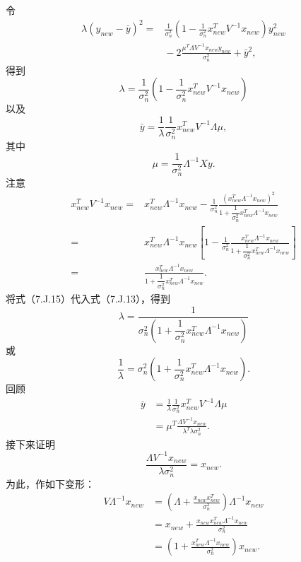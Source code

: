 令
\[
\begin{aligned}
\lambda(y_{new}-\bar y)^2
={}&\frac1{\sigma_n^2}\left(1-\frac1{\sigma_n^2}x_{new}^TV^{-1}x_{new}\right)y_{new}^2\\
&{}-2\frac{\mu^T\Lambda V^{-1}x_{new}y_{new}}{\sigma_n^2}+\bar y^2,
\end{aligned}
\]
得到
\begin{equation}
\lambda=\frac1{\sigma_n^2}\left(1-\frac1{\sigma_n^2}x_{new}^TV^{-1}x_{new}\right)\tag{7.J.13}
\end{equation}
以及
\begin{equation}
\bar y=\frac1\lambda\frac1{\sigma_n^2}x_{new}^TV^{-1}\Lambda\mu,\tag{7.J.14}
\end{equation}
其中
\[
\mu=\frac1{\sigma_n^2}\Lambda^{-1}Xy.
\]
注意
\begin{equation}
\begin{aligned}
x_{new}^TV^{-1}x_{new}
={}&x_{new}^T\Lambda^{-1}x_{new}
 -\frac1{\sigma_n^2}\frac{(x_{new}^T\Lambda^{-1}x_{new})^2}
 {1+\dfrac1{\sigma_n^2}x_{new}^T\Lambda^{-1}x_{new}}\\
={}&x_{new}^T\Lambda^{-1}x_{new}\left[1-\frac1{\sigma_n^2}
 \frac{x_{new}^T\Lambda^{-1}x_{new}}
 {1+\dfrac1{\sigma_n^2}x_{new}^T\Lambda^{-1}x_{new}}\right]\\
={}&\frac{x_{new}^T\Lambda^{-1}x_{new}}
 {1+\dfrac1{\sigma_n^2}x_{new}^T\Lambda^{-1}x_{new}}.
\end{aligned}\tag{7.J.15}
\end{equation}
将式（7.J.15）代入式（7.J.13），得到
\begin{equation}
\lambda=\frac1{\sigma_n^2\left(1+\dfrac1{\sigma_n^2}x_{new}^T\Lambda^{-1}x_{new}\right)}\tag{7.J.16}
\end{equation}
或
\begin{equation}
\frac1\lambda=\sigma_n^2\left(1+\frac1{\sigma_n^2}x_{new}^T\Lambda^{-1}x_{new}\right).\tag{7.J.17}
\end{equation}
回顾
\begin{equation}
\begin{aligned}
\bar y&=\frac1\lambda\frac1{\sigma_n^2}x_{new}^TV^{-1}\Lambda\mu\\
 &=\mu^T\frac{\Lambda V^{-1}x_{new}}{\lambda^T\lambda\sigma_n^2}.
\end{aligned}\tag{7.J.18}
\end{equation}
接下来证明
\[
\frac{\Lambda V^{-1}x_{new}}{\lambda\sigma_n^2}=x_{new}.
\]
为此，作如下变形：
\begin{equation}
\begin{aligned}
V\Lambda^{-1}x_{new}
 &=\left(\Lambda+\frac{x_{new}x_{new}^T}{\sigma_n^2}\right)\Lambda^{-1}x_{new}\\
 &=x_{new}+\frac{x_{new}x_{new}^T\Lambda^{-1}x_{new}}{\sigma_n^2}\\
 &=\left(1+\frac{x_{new}^T\Lambda^{-1}x_{new}}{\sigma_n^2}\right)x_{new}.
\end{aligned}\tag{7.J.19}
\end{equation}
